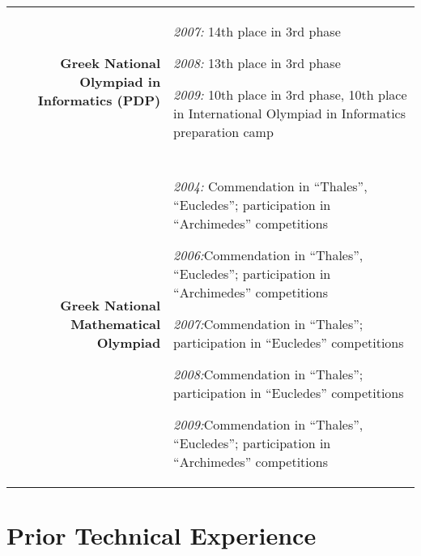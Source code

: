 \documentclass[letterpaper]{article}
\begin{document}
\begin{tabularx}{\textwidth}{rX}
  {\bf Greek National Olympiad in Informatics (PDP)} &
  {\it 2007:} 14th place in 3rd phase \par
  {\it 2008:} 13th place in 3rd phase \par
  {\it 2009:} 10th place in 3rd phase, 10th place in International Olympiad
  in Informatics preparation camp \\
  \\
  {\bf Greek National Mathematical Olympiad} &
  {\it 2004:} Commendation in ``Thales'', ``Eucledes''; participation
  in ``Archimedes'' competitions \par
  {\it 2006:}Commendation in ``Thales'', ``Eucledes''; participation
  in ``Archimedes'' competitions \par
  {\it 2007:}Commendation in ``Thales''; participation
  in ``Eucledes'' competitions \par
  {\it 2008:}Commendation in ``Thales''; participation
  in ``Eucledes'' competitions \par
  {\it 2009:}Commendation in ``Thales'', ``Eucledes''; participation
  in ``Archimedes'' competitions\\
\end{tabularx}

\section*{Prior Technical Experience}
\end{document}
